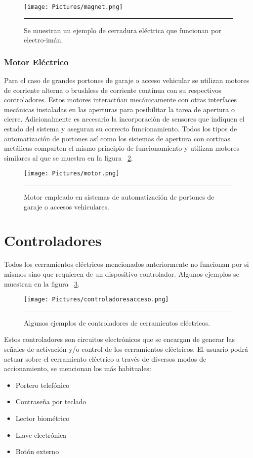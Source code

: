 \begin{figure}[htbp]
	\centering
	\texttt{[image: Pictures/magnet.png]}
	\rule{35em}{1pt}
	\caption[Cerradura Electroimán]{Se muestran un ejemplo de cerradura eléctrica que funcionan por electro-imán. }
	\label{fig:cerr-mag}
\end{figure}

\subsubsection{Motor Eléctrico}
Para el caso de grandes portones de garaje o acceso vehicular se utilizan motores de corriente alterna o brushless de corriente continua con su respectivos controladores. Estos motores interactúan mecánicamente con otras interfaces mecánicas instaladas en las aperturas para posibilitar la tarea de apertura o cierre. Adicionalmente es necesario la incorporación de sensores que indiquen el estado del sistema y aseguran su correcto funcionamiento.
Todos los tipos de automatización de portones así como los sistemas de apertura con cortinas metálicas comparten el mismo principio de funcionamiento y utilizan motores similares al que se muestra en la figura ~\ref{fig:motorport}.

\begin{figure}[htbp]
	\centering
	\texttt{[image: Pictures/motor.png]}
	\rule{35em}{1pt}
	\caption[Motor Portones Automatizados]{Motor empleado en sistemas de automatización de portones de garaje o accesos vehiculares. }
	\label{fig:motorport}
\end{figure}

\section{Controladores}
\label{section:controladores}
Todos los cerramientos eléctricos mencionados anteriormente no funcionan por si mismos sino que requieren de un dispositivo controlador.
Algunos ejemplos se muestran en la figura ~\ref{fig:controladoresacceso}.\\
\begin{figure}[htbp]
	\centering
	\texttt{[image: Pictures/controladoresacceso.png]}
	\rule{35em}{1pt}
	\caption[Controladores de Acceso]{Algunos ejemplos de controladores de cerramientos eléctricos.}
	\label{fig:controladoresacceso}
\end{figure}
Estos controladores son circuitos electrónicos que se encargan de generar las señales de activación y/o control de los cerramientos eléctricos. El usuario podrá actuar sobre el cerramiento eléctrico a través de diversos modos de accionamiento, se mencionan los más habituales:
\begin{itemize}
	\item Portero telefónico
	\item Contraseña por teclado
	\item Lector biométrico
	\item Llave electrónica
	\item Botón externo
\end{itemize}

